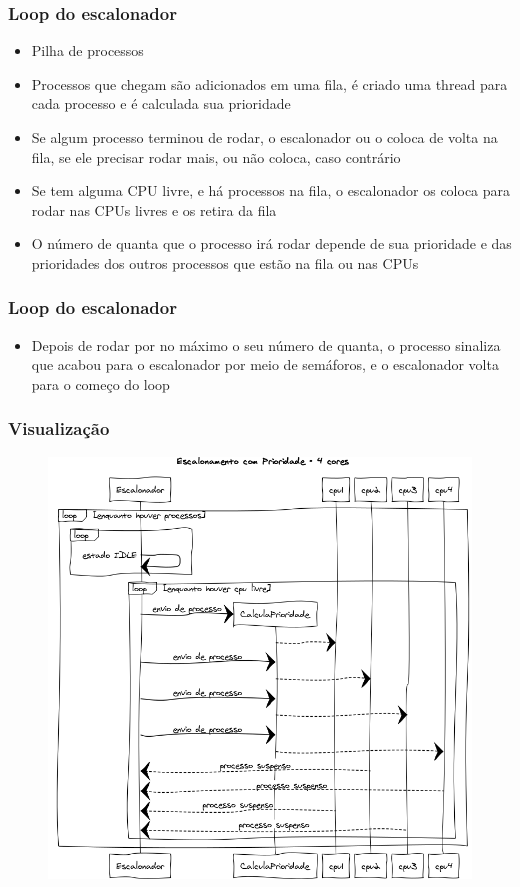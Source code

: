 \documentclass{beamer}
\begin{document}
\begin{frame}
\frametitle{Loop do escalonador}
\begin{itemize}
\item Pilha de processos
\item Processos que chegam são adicionados em uma fila, é criado uma thread para cada processo e é calculada sua prioridade
\item Se algum processo terminou de rodar, o escalonador ou o coloca de volta na fila, se ele precisar rodar mais, ou não coloca, caso contrário
\item Se tem alguma CPU livre, e há processos na fila, o escalonador os coloca para rodar nas CPUs livres e os retira da fila
\item O número de quanta que o processo irá rodar depende de sua prioridade e das prioridades dos outros processos que estão na fila ou nas CPUs
\end{itemize}
\end{frame}

\begin{frame}
\frametitle{Loop do escalonador}
\begin{itemize}
\item Depois de rodar por no máximo o seu número de quanta, o processo sinaliza que acabou para o escalonador por meio de semáforos, e o escalonador volta para o começo do loop
\end{itemize}
\end{frame}

\begin{frame}
\frametitle{Visualização}
\begin{figure}
\includegraphics[scale=0.27]{prr.png}
\end{figure}
\end{frame}
\end{document}
